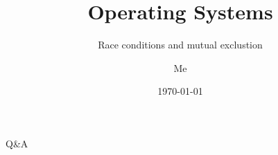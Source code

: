 \documentclass[12pt]{beamer}
\title{Operating Systems}
\subtitle{Race conditions and mutual exclustion}
\author{Me}
\date{\today}
\begin{document}
  \begin{frame}
    \titlepage
  \end{frame}

  
  
  

  \begin{frame}
  \begin{center}
  \Huge Q\&A
  \end{center}
  \end{frame}
\end{document}
